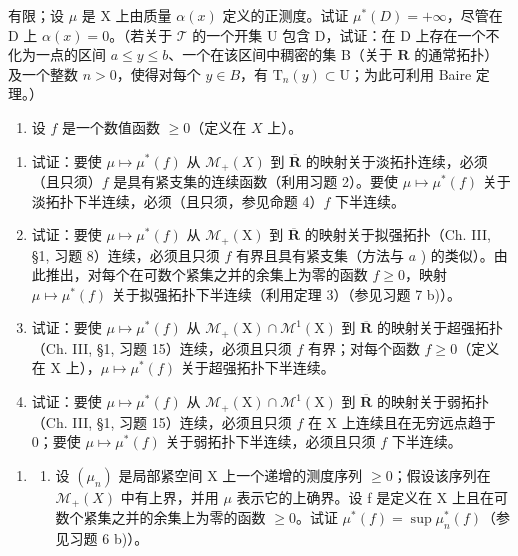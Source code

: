 有限；设 \(\mu\) 是 X 上由质量 \(\alpha(x)\) 定义的正测度。试证 \(\mu^{*}(D) = +\infty\)，尽管在 D 上 \(\alpha(x) = 0\)。（若关于 \(\mathcal{T}\) 的一个开集 U 包含 D，试证：在 D 上存在一个不化为一点的区间 \(a \leqslant y \leqslant b\)、一个在该区间中稠密的集 B（关于 \(\mathbf{R}\) 的通常拓扑）及一个整数 \(n > 0\)，使得对每个 \(y \in B\)，有 \(\mathrm{T}_{n}(y) \subset \mathrm{U}\)；为此可利用 Baire 定理。）

\begin{enumerate}
\def\labelenumi{\arabic{enumi})}
\setcounter{enumi}{5}
\tightlist
\item
  设 \(f\) 是一个数值函数 \(\geqslant 0\)（定义在 \(X\) 上）。
\end{enumerate}

\begin{enumerate}
\def\labelenumi{\alph{enumi})}
\item
  试证：要使 \(\mu \mapsto \mu^{*}(f)\) 从 \(\mathcal{M}_{+}(X)\) 到 \(\overline{\mathbf{R}}\) 的映射关于淡拓扑连续，必须（且只须）\(f\) 是具有紧支集的连续函数（利用习题 2）。要使 \(\mu \mapsto \mu^{*}(f)\) 关于淡拓扑下半连续，必须（且只须，参见命题 4）\(f\) 下半连续。
\item
  试证：要使 \(\mu \mapsto \mu^{*}(f)\) 从 \(\mathcal{M}_{+}(\mathrm{X})\) 到 \(\overline{\mathbf{R}}\) 的映射关于拟强拓扑（Ch. III, §1, 习题 8）连续，必须且只须 \(f\) 有界且具有紧支集（方法与 \(a\) ) 的类似）。由此推出，对每个在可数个紧集之并的余集上为零的函数 \(f \geqslant 0\)，映射 \(\mu \mapsto \mu^{*}(f)\) 关于拟强拓扑下半连续（利用定理 3）（参见习题 7 b)）。
\item
  试证：要使 \(\mu \mapsto \mu^{*}(f)\) 从 \(\mathcal{M}_{+}(\mathrm{X}) \cap \mathcal{M}^{1}(\mathrm{X})\) 到 \(\overline{\mathbf{R}}\) 的映射关于超强拓扑（Ch. III, §1, 习题 15）连续，必须且只须 \(f\) 有界；对每个函数 \(f \geqslant 0\)（定义在 \(\mathrm{X}\) 上），\(\mu \mapsto \mu^{*}(f)\) 关于超强拓扑下半连续。
\item
  试证：要使 \(\mu \mapsto \mu^{*}(f)\) 从 \(\mathcal{M}_{+}(\mathrm{X}) \cap \mathcal{M}^{1}(\mathrm{X})\) 到 \(\overline{\mathbf{R}}\) 的映射关于弱拓扑（Ch. III, §1, 习题 15）连续，必须且只须 \(f\) 在 \(\mathrm{X}\) 上连续且在无穷远点趋于 0；要使 \(\mu \mapsto \mu^{*}(f)\) 关于弱拓扑下半连续，必须且只须 \(f\) 下半连续。
\end{enumerate}

\begin{enumerate}
\def\labelenumi{\arabic{enumi})}
\setcounter{enumi}{6}
\tightlist
\item
  \begin{enumerate}
  \def\labelenumii{\alph{enumii})}
  \tightlist
  \item
    设 \((\mu_{n})\) 是局部紧空间 X 上一个递增的测度序列 \(\geqslant0\)；假设该序列在 \(\mathcal{M}_{+}(X)\) 中有上界，并用 \(\mu\) 表示它的上确界。设 f 是定义在 X 上且在可数个紧集之并的余集上为零的函数 \(\geqslant0\)。试证 \(\mu^{*}(f)=\sup\mu_{n}^{*}(f)\)（参见习题 6 b)）。
  \end{enumerate}
\end{enumerate}

